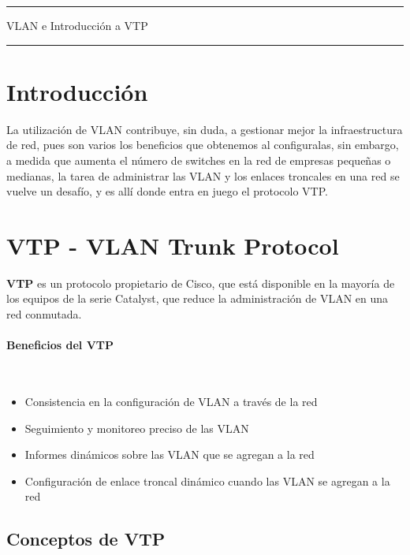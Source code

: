 \documentclass[12pt]{article}
\begin{document}
\begin{center}


\noindent\rule{\textwidth}{1pt}
\huge{VLAN e Introducción a VTP}
\noindent\rule{\textwidth}{1pt}
\end{center}
 
\section{Introducción}   
La utilización de VLAN contribuye, sin duda, a gestionar mejor la infraestructura de red, pues son varios los beneficios que obtenemos al configuralas, sin embargo, a medida que aumenta el número de switches en la red de empresas pequeñas o medianas, la tarea de administrar las VLAN y los enlaces troncales en una red se vuelve un desafío, y es allí donde entra en juego el protocolo VTP.

\section{VTP - VLAN Trunk Protocol}

\textbf{VTP} es un protocolo propietario de Cisco, que está disponible en la mayoría de los equipos de la serie Catalyst, que reduce la administración de VLAN en una red conmutada.

\paragraph{Beneficios del VTP}\\
\begin{itemize}
    \item Consistencia en la configuración de VLAN a través de la red
    \item Seguimiento y monitoreo preciso de las VLAN
    \item Informes dinámicos sobre las VLAN que se agregan a la red
    \item Configuración de enlace troncal dinámico cuando las VLAN se agregan a la red
\end{itemize}

 \subsection{Conceptos de VTP}
\end{document}
